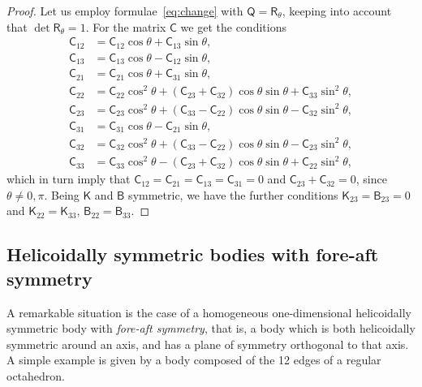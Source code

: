 \documentclass[final]{amsart}
\theoremstyle{definition}
\theoremstyle{definition}
\theoremstyle{remark}
\begin{document}
\begin{proof}
  Let us employ formulae~\eqref{eq:change} with ${\mathsf Q}={\mathsf R}_\theta$,
  keeping into account that $\det{\mathsf R}_\theta=1$. For the matrix ${\mathsf C}$ we get the conditions
\begin{align*}
{\mathsf C}_{12} & = {\mathsf C}_{12}\cos\theta + {\mathsf C}_{13}\sin\theta,\\
{\mathsf C}_{13} & = {\mathsf C}_{13}\cos\theta - {\mathsf C}_{12}\sin\theta,\\ 
{\mathsf C}_{21} & = {\mathsf C}_{21}\cos\theta + {\mathsf C}_{31}\sin\theta,\\
{\mathsf C}_{22} & = {\mathsf C}_{22}\cos^2\theta +({\mathsf C}_{23}+{\mathsf C}_{32})\cos\theta\sin\theta
+{\mathsf C}_{33} \sin^2\theta,\\
{\mathsf C}_{23} & = {\mathsf C}_{23}\cos^2\theta +({\mathsf C}_{33}-{\mathsf C}_{22})\cos\theta\sin\theta 
-{\mathsf C}_{32} \sin^2\theta,\\
{\mathsf C}_{31} & = {\mathsf C}_{31}\cos\theta -{\mathsf C}_{21}\sin\theta,\\
{\mathsf C}_{32} & = {\mathsf C}_{32}\cos^2\theta + ({\mathsf C}_{33}-{\mathsf C}_{22}) \cos\theta\sin\theta 
-{\mathsf C}_{23}\sin^2\theta,\\
{\mathsf C}_{33} & = {\mathsf C}_{33}\cos^2\theta - ({\mathsf C}_{23}+{\mathsf C}_{32}) \cos\theta\sin\theta 
+{\mathsf C}_{22}\sin^2\theta,
\end{align*}
which in turn imply that ${\mathsf C}_{12}={\mathsf C}_{21}={\mathsf C}_{13}={\mathsf C}_{31}=0$ and ${\mathsf C}_{23}+{\mathsf C}_{32}=0$, since $\theta\neq
0,\pi$. Being ${\mathsf K}$ and ${\mathsf B}$ symmetric, we have the
further conditions ${\mathsf K}_{23}={\mathsf B}_{23}=0$ and ${\mathsf K}_{22}={\mathsf K}_{33}$, ${\mathsf B}_{22}={\mathsf B}_{33}$.
\end{proof}

\subsection{Helicoidally symmetric bodies with fore-aft symmetry}

A remarkable situation is the case of a homogeneous one-dimensional
helicoidally symmetric body with {\em fore-aft symmetry}, that is, a
body which is both helicoidally symmetric around an axis, and has a
plane of symmetry orthogonal to that axis. A simple example is given
by a body composed of the 12 edges of a regular octahedron.
\end{document}
